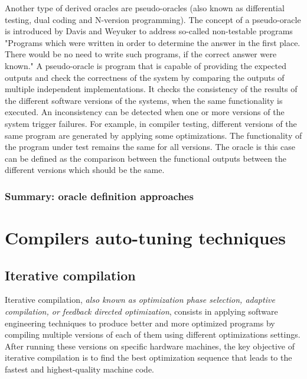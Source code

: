 \begin{itemize}
	
	
	Another type of derived oracles are pseudo-oracles (also known as differential testing, dual coding and N-version programming). 
	The concept of a pseudo-oracle is introduced by Davis and Weyuker\cite{davis1981pseudo} to address so-called non-testable programs "Programs which were written in order to determine the answer in the first place. There would be no need to write such programs, if the correct answer were known."
	A pseudo-oracle is program that is capable of providing the expected outputs and check the correctness of the system by comparing the outputs of multiple independent implementations. 
	It checks the consistency of the results of the different software versions of the systems, when the same functionality is executed. An inconsistency can be detected when one or more versions of the system trigger failures. 
	For example, in compiler testing, different versions of the same program are generated by applying some optimizations. The functionality of the program under test remains the same for all versions. The oracle is this case can be defined as the comparison between the functional outputs between the different versions which should be the same\cite{yang2011finding}.
	
	
\end{itemize}


\subsubsection{Summary: oracle definition approaches}


\section{Compilers auto-tuning techniques}
\label{sec:Compilers auto-tuning techniques}

\subsection{Iterative compilation}
Iterative compilation, \textit{also known as optimization phase selection, adaptive compilation, or feedback directed optimization}\cite{triantafyllis2003compiler}, consists in applying software engineering techniques to produce better and more optimized programs by compiling multiple versions of each of them using different optimizations settings. After running these versions on specific hardware machines, the key objective of iterative compilation is to find the best optimization sequence that leads to the fastest and highest-quality machine code. 

